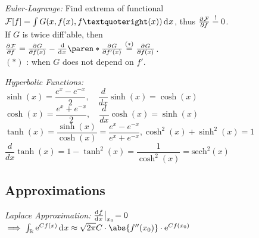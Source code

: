 \emph{Euler-Lagrange:}
Find extrema of functional $\mathcal F[f] = \int G(x, f(x), f’(x)) \diff x$,
thus $\pderiv{\mathcal F}{f} \overset!= 0$.
\\
If $G$ is twice diff'able, then
\\
$\pderiv{\mathcal F}{f} = \pderiv{G}{f(x)} - \deriv{}{x} \paren*{ \pderiv{G}{f'(x)} } \overset{(\ast)}= \pderiv{G}{f(x)}$.
\\
$(\ast)$ : when $G$ does not depend on $f'$.

\emph{Hyperbolic Functions:}\\
$\sinh(x)=\dfrac{e^x - e^{-x}}{2},\quad \dfrac{d}{dx} \sinh(x)= \cosh(x)$ \\
$ \cosh(x) = \dfrac{e^x + e^{-x}}{2}, \quad \dfrac{d}{dx} \cosh(x)= \sinh(x)$\\
$ \tanh(x) = \dfrac{\sinh(x)}{\cosh(x)}=\dfrac{e^x - e^{-x}}{e^x + e^{-x}}, \cosh^2(x) + \sinh^2(x) = 1 $\\
$ \dfrac{d}{dx} \tanh(x)= 1-\tanh^2(x)=\dfrac{1}{\cosh^2(x)}=\text{sech}^2(x)$

\subsection{Approximations}

\emph{Laplace Approximation:}
$\deriv{f}{x} \big\vert_{x_0} \!= 0$\\
$\implies \int_{\mathbb R} \eu^{C f(x)} \diff x \approx \sqrt{2\pi} C \cdot \abs{f''(x_0)} \cdot \eu^{C f(x_0)}$

